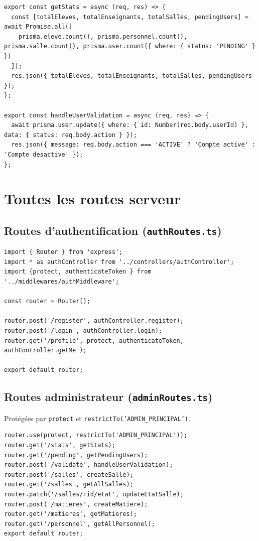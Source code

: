 \documentclass[12pt,a4paper]{article}
\begin{document}
\begin{lstlisting}[style=code]
export const getStats = async (req, res) => {
  const [totalEleves, totalEnseignants, totalSalles, pendingUsers] = await Promise.all([
    prisma.eleve.count(), prisma.personnel.count(), prisma.salle.count(), prisma.user.count({ where: { status: 'PENDING' } })
  ]);
  res.json({ totalEleves, totalEnseignants, totalSalles, pendingUsers });
};

export const handleUserValidation = async (req, res) => {
  await prisma.user.update({ where: { id: Number(req.body.userId) }, data: { status: req.body.action } });
  res.json({ message: req.body.action === 'ACTIVE' ? 'Compte active' : 'Compte desactive' });
};
\end{lstlisting}

\newpage

\section{Toutes les routes serveur}

\subsection{Routes d'authentification (\texttt{authRoutes.ts})}

\begin{lstlisting}[style=code]
import { Router } from 'express';
import * as authController from '../controllers/authController';
import {protect, authenticateToken } from '../middlewares/authMiddleware';

const router = Router();

router.post('/register', authController.register);
router.post('/login', authController.login);
router.get('/profile', protect, authenticateToken, authController.getMe );

export default router;
\end{lstlisting}

\subsection{Routes administrateur (\texttt{adminRoutes.ts})}

Protégées par \texttt{protect} et \texttt{restrictTo('ADMIN\_PRINCIPAL')}.

\begin{lstlisting}[style=code]
router.use(protect, restrictTo('ADMIN_PRINCIPAL'));
router.get('/stats', getStats);
router.get('/pending', getPendingUsers);
router.post('/validate', handleUserValidation);
router.post('/salles', createSalle);
router.get('/salles', getAllSalles);
router.patch('/salles/:id/etat', updateEtatSalle);
router.post('/matieres', createMatiere);
router.get('/matieres', getMatieres);
router.get('/personnel', getAllPersonnel);
export default router;
\end{lstlisting}
\end{document}
